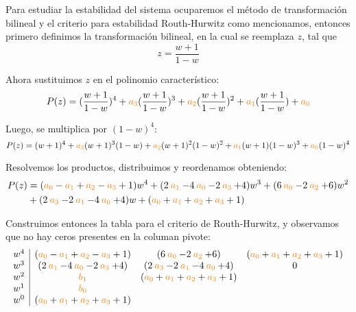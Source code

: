Para estudiar la estabilidad del sistema ocuparemos el método de transformación
bilineal y el criterio para estabilidad Routh-Hurwitz como mencionamos, entonces
primero definimos la transformación bilineal, en la cual se reemplaza $z$, tal que 
\begin{equation}
    z = \frac{w+1}{1-w}
\end{equation}

Ahora sustituimos $z$ en el polinomio característico:
\begin{equation}
    P(z) = (\frac{w+1}{1-w})^4 + \nara{a_3}(\frac{w+1}{1-w})^3 + \nara{a_2} (\frac{w+1}{1-w})^2 + \nara{a_1} (\frac{w+1}{1-w}) + \nara{a_0}
\end{equation}

Luego, se multiplica por $(1-w)^4$:
\begin{equation}
    P(z) = ({w+1})^4+ \nara{a_3}({w+1})^3(1-w)  + \nara{a_2} ({w+1})^2 (1-w) ^2+ \nara{a_1} ({w+1})(1-w)^3 + \nara{a_0}(1-w)^4
\end{equation}


Resolvemos los productos, distribuimos y reordenamos obteniendo:
\begin{align}
  P(z) &= (\nara{a_0} - \nara{a_1} + \nara{a_2} -\nara{a_3} + 1)w^4 +( 2\nara{a_1} - 4\nara{a_0} - 2 \nara{a_3} +4 ) w^3  
    + ( 6\nara{a_0} - 2\nara{a_2} +6 ) w^2 \nonumber \\
    &+ (2\nara{a_3} - 2\nara{a_1} - 4\nara{a_0} + 4 ) w +
    (\nara{a_0} + \nara{a_1} + \nara{a_2} +\nara{a_3} + 1)
\end{align}

Construimos entonces la tabla para el criterio de Routh-Hurwitz, y observamos
que no hay ceros presentes en la columan pivote:
\begin{equation}
  \begin{array}{c|ccc}
    w^4 & (\nara{a_0} - \nara{a_1} + \nara{a_2} -\nara{a_3} + 1) & ( 6\nara{a_0} - 2\nara{a_2} +6 )  &  (\nara{a_0} + \nara{a_1} + \nara{a_2} +\nara{a_3} + 1)\\
    w^3 &( 2\nara{a_1} - 4\nara{a_0} - 2 \nara{a_3} +4 )   &(2\nara{a_3} - 2\nara{a_1} - 4\nara{a_0} + 4 )  & 0\\
    w^2 & \nara{b_1} &  (\nara{a_0} + \nara{a_1} + \nara{a_2} +\nara{a_3} + 1)\\
    w^1 & \nara{b_0} &  \\
    w^0 &    (\nara{a_0} + \nara{a_1} + \nara{a_2} +\nara{a_3} + 1)  & 
  \end{array}
\end{equation}

